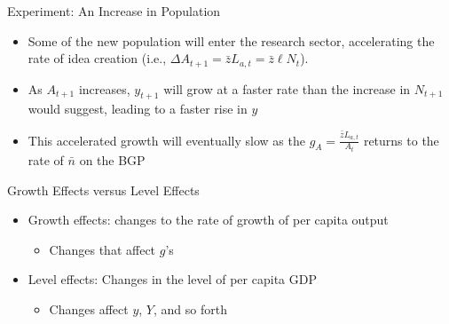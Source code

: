\documentclass[aspectratio=1610]{beamer}
\begin{document}
\begin{frame}[wide]{Experiment: An Increase in Population}
	\begin{itemize}
		\item Some of the new population will enter the research sector, accelerating the rate of idea creation (i.e., $\Delta A_{t+1} = \bar{z} L_{a,t} = \bar{z} \ell N_t$).
		\vspace{1mm}
		\item As $A_{t+1}$ increases, $y_{t+1}$ will grow at a faster rate than the increase in $N_{t+1}$ would suggest, leading to a faster rise in $y$
		\vspace{1mm}
		\item This accelerated growth will eventually slow as the $g_A = \frac{\bar{z}L_{a,t}}{A_t}$ returns to the rate of $\bar{n}$ on the BGP 
	\end{itemize}
\end{frame}


%	



\begin{frame}[wide]{Growth Effects versus Level Effects}
	\begin{itemize}
		\item Growth effects: changes to the rate of growth of per capita output
		\begin{itemize}
			\item Changes that affect $g$'s
		\end{itemize}
		\vspace{3mm}
		\item Level effects: Changes in the level of per capita GDP
		\begin{itemize}
			\item Changes affect $y$, $Y$, and so forth
		\end{itemize}
		
	\end{itemize}
\end{frame}
\end{document}
